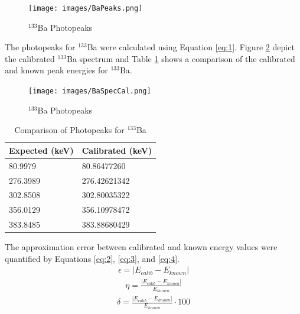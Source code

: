 \begin{figure}[H]
\centering
\texttt{[image: images/BaPeaks.png]}
\caption{$^{133}$Ba Photopeaks}
\label{fig:BaPeaks}
\end{figure}

The photopeaks for $^{133}$Ba were calculated using Equation \ref{eq:1}. Figure \ref{fig:BaSpecCal} depict the calibrated $^{133}$Ba spectrum and Table \ref{tab:Comp} shows a comparison of the calibrated and known peak energies for $^{133}$Ba.

\begin{figure}[H]
\centering
\texttt{[image: images/BaSpecCal.png]}
\caption{$^{133}$Ba Photopeaks}
\label{fig:BaSpecCal}
\end{figure}

\begin{table}[H]
\centering
\caption{Comparison of Photopeaks for $^{133}$Ba}
\label{tab:Comp}
\begin{tabular}{@{}ll@{}}
\toprule
Expected (keV) & Calibrated (keV) \\ \midrule
80.9979 & 80.86477260 \\
276.3989 & 276.42621342 \\
302.8508 & 302.80035322 \\
356.0129 & 356.10978472 \\
383.8485 & 383.88680429 \\ \bottomrule
\end{tabular}
\end{table}

The approximation error between calibrated and known energy values were quantified by Equations \ref{eq:2}, \ref{eq:3}, and \ref{eq:4}.
\begin{align}
\epsilon =\left | E_{calib}-E_{known} \right | \label{eq:2}
\end{align}
\begin{align}
\eta = \frac{\left | E_{calib}-E_{known} \right |}{E_{known}} \label{eq:3}
\end{align}
\begin{align}
\delta = \frac{\left | E_{calib}-E_{known} \right |}{E_{known}}\cdot 100 \label{eq:4}
\end{align}

